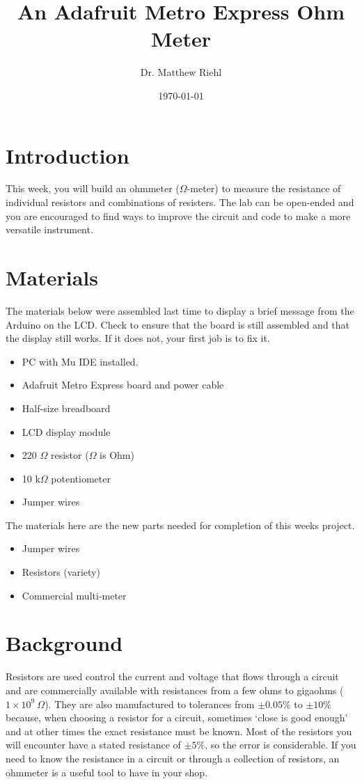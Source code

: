 \documentclass[]{article}
\title{An Adafruit Metro Express Ohm Meter}
\author{Dr. Matthew Riehl}
\date \today
\begin{document}
\newcommand{\ds}{\displaystyle}
	\maketitle
	\newcommand{\tc}{\textcolor}
	\section{Introduction}
	
	This week, you will build an ohmmeter ($\Omega$-meter) to measure the resistance of individual resistors and combinations of resisters.  The lab can be open-ended and you are encouraged to find ways to improve the circuit and code to make a more versatile instrument.
	
	\section{Materials}
	The materials below were assembled last time to display a brief message from the Arduino on the LCD.  Check to ensure that the board is still assembled and that the display still works.  If it does not, your first job is to fix it.
	\begin{itemize}
		\item PC with Mu IDE installed.
		\item Adafruit Metro Express board and power cable
		\item Half-size breadboard
		\item LCD display module
		\item 220 $\Omega$ resistor ($\Omega$ is Ohm)
		\item 10 k$\Omega$ potentiometer
		\item Jumper wires
	\end{itemize}
	The materials here are the new parts needed for completion of this weeks project.
	\begin{itemize}
		\item Jumper wires
		\item Resistors (variety)
		\item Commercial multi-meter
	\end{itemize}

	\section{Background}
	Resistors are used control the current and voltage that flows through a circuit and are commercially available with resistances from a few ohms to gigaohms ($1\times 10^9\ \Omega$).  They are also manufactured to tolerances from $\pm 0.05 \%$ to $\pm 10 \% $ because, when choosing a resistor for a circuit, sometimes `close is good enough' and at other times the exact resistance must be known.  Most of the resistors you will encounter have a stated resistance of $\pm 5\%$, so the error is considerable.  If you need to know the resistance in a circuit or through a collection of resistors, an ohmmeter is a useful tool to have in your shop.
\end{document}
